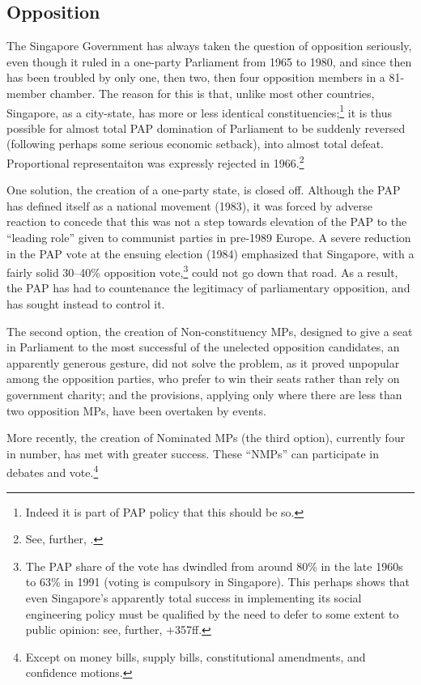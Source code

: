 \subsection{Opposition}
The Singapore Government has always taken the question of
opposition seriously, even though it ruled in a one-party
Parliament from 1965 to 1980, and since then has been troubled by
only one, then two, then four opposition members in a 81-member
chamber. The reason for this is that, unlike most other
countries, Singapore, as a city-state, has more or less identical
constituencies;\footnote{ Indeed it is part of PAP policy that
  this should be so.} it is thus possible for almost total PAP
domination of Parliament to be suddenly reversed (following
perhaps some serious economic setback), into almost total defeat.
Proportional representaiton was expressly rejected in
1966.\footnote{ See, further, .}


One solution, the creation of a one-party state, is closed off.
Although the PAP has defined itself as a national movement
(1983), it was forced by adverse reaction to concede that this
was not a step towards elevation of the PAP to the ``leading
role'' given to communist parties in pre-1989 Europe. A severe
reduction in the PAP vote at the ensuing election (1984)
emphasized that Singapore, with a fairly solid 30--40\%
opposition vote,\footnote{ The PAP share of the vote has dwindled
  from around 80\% in the late 1960s to 63\% in 1991 (voting is
  compulsory in Singapore). This perhaps shows that even
  Singapore's apparently total success in implementing its social
  engineering policy must be qualified by the need to defer to
  some extent to public opinion: see, further,
  +{357ff}.} could not go down that
road. As a result, the PAP has had to countenance the legitimacy
of parliamentary opposition, and has sought instead to control
it.

The second option, the creation of Non-constituency MPs, designed
to give a seat in Parliament to the most successful of the
unelected opposition candidates, an apparently generous gesture,
did not solve the problem, as it proved unpopular among the
opposition parties, who prefer to win their seats rather than
rely on government charity; and the provisions, applying only
where there are less than two opposition MPs, have been overtaken
by events.

     More recently, the creation of Nominated MPs (the third
option), currently four in number, has met with greater success.
These ``NMPs'' can participate in debates and vote.\footnote{ Except on money bills, supply bills, constitutional
amendments, and confidence motions.}
 

